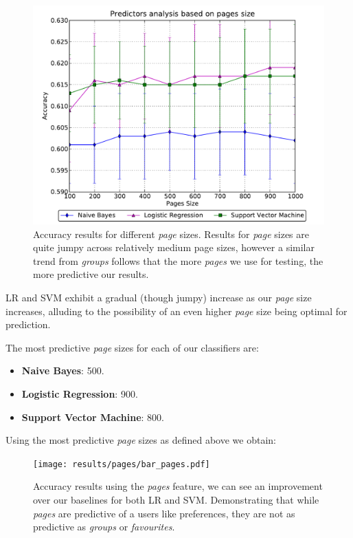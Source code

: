 \begin{figure}[h]
	\begin{center}
		\includegraphics[scale=0.75]{results/pages/top_pages.pdf}
		\caption{Accuracy results for different \emph{page} sizes. Results for \emph{page} sizes are quite jumpy across relatively medium page sizes, however a similar trend 
				 from \emph{groups} follows that the more \emph{pages} we use for testing, the more predictive our results.}
	\end{center}
\end{figure}

LR and SVM exhibit a gradual (though jumpy) increase as our \emph{page} size increases, alluding to the possibility of an even higher \emph{page}
size being optimal for prediction.

The most predictive \emph{page} sizes for each of our classifiers are:
\begin{itemize}
\item \textbf{Naive Bayes}: 500.
\item \textbf{Logistic Regression}: 900.
\item \textbf{Support Vector Machine}: 800.
\end{itemize}

\clearpage

Using the most predictive \emph{page} sizes as defined above we obtain:

\begin{figure}[h]
	\begin{center}
		\texttt{[image: results/pages/bar\_pages.pdf]}
		\caption{Accuracy results using the \emph{pages} feature, we can see an improvement over our baselines for both LR and SVM. 
				 Demonstrating that while \emph{pages} are predictive of a users like preferences, they are not as predictive as 
				 \emph{groups} or \emph{favourites}.}
	\end{center}
\end{figure}


